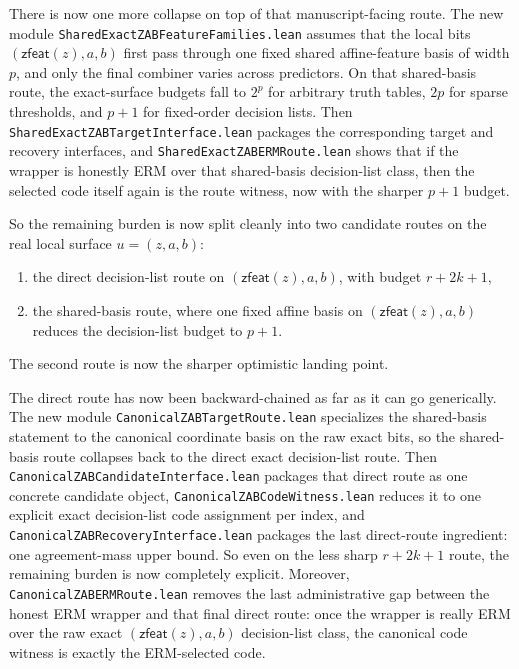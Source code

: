 \documentclass[11pt]{article}
\theoremstyle{remark}
\begin{document}
There is now one more collapse on top of that manuscript-facing route.  The new
module \texttt{SharedExactZABFeatureFamilies.lean} assumes that the local bits
\((\mathsf{zfeat}(z),a,b)\) first pass through one fixed shared affine-feature
basis of width \(p\), and only the final combiner varies across predictors.  On
that shared-basis route, the exact-surface budgets fall to \(2^p\) for arbitrary
truth tables, \(2p\) for sparse thresholds, and \(p+1\) for fixed-order
decision lists.  Then \texttt{SharedExactZABTargetInterface.lean} packages the
corresponding target and recovery interfaces, and
\texttt{SharedExactZABERMRoute.lean} shows that if the wrapper is honestly ERM
over that shared-basis decision-list class, then the selected code itself again
is the route witness, now with the sharper \(p+1\) budget.

So the remaining burden is now split cleanly into two candidate routes on the
real local surface \(u=(z,a,b)\):
\begin{enumerate}[leftmargin=1.5em]
  \item the direct decision-list route on \((\mathsf{zfeat}(z),a,b)\), with budget \(r+2k+1\),
  \item the shared-basis route, where one fixed affine basis on \((\mathsf{zfeat}(z),a,b)\) reduces the decision-list budget to \(p+1\).
\end{enumerate}
The second route is now the sharper optimistic landing point.

The direct route has now been backward-chained as far as it can go generically.
The new module \texttt{CanonicalZABTargetRoute.lean} specializes the
shared-basis statement to the canonical coordinate basis on the raw exact bits,
so the shared-basis route collapses back to the direct exact decision-list
route.  Then \texttt{CanonicalZABCandidateInterface.lean} packages that direct
route as one concrete candidate object, \texttt{CanonicalZABCodeWitness.lean}
reduces it to one explicit exact decision-list code assignment per index, and
\texttt{CanonicalZABRecoveryInterface.lean} packages the last direct-route
ingredient: one agreement-mass upper bound.  So even on the less sharp
\(r+2k+1\) route, the remaining burden is now completely explicit.  Moreover,
\texttt{CanonicalZABERMRoute.lean} removes the last administrative gap between
the honest ERM wrapper and that final direct route: once the wrapper is really
ERM over the raw exact \((\mathsf{zfeat}(z),a,b)\) decision-list class, the
canonical code witness is exactly the ERM-selected code.
\end{document}
